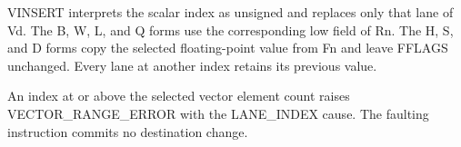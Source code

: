 VINSERT interprets the scalar index as unsigned and replaces only that lane of
Vd. The B, W, L, and Q forms use the corresponding low field of Rn. The H, S,
and D forms copy the selected floating-point value from Fn and leave FFLAGS
unchanged. Every lane at another index retains its previous value.

An index at or above the selected vector element count raises
VECTOR\_RANGE\_ERROR with the LANE\_INDEX cause. The faulting instruction
commits no destination change.
